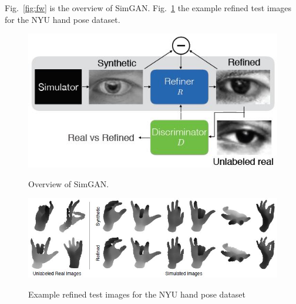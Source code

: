 \documentclass[]{IEEEtran}
\begin{document}
	Fig.~\ref{fig:fw} is the overview of SimGAN. Fig.~\ref{fig:rt} the example refined test images for the NYU hand pose dataset.
	


\newpage
\begin{figure}[!hbt]
		\vspace{1.7cm}
		\begin{center}
			\includegraphics[width=\columnwidth]{fw}
			\caption{Overview of SimGAN.}
			\label{fig:fw}
		    \hspace{0.5cm}
			\includegraphics[width=\columnwidth]{rs}
			\caption{Example refined test images for the NYU hand pose dataset}
			\label{fig:rt}
		\end{center}
	\end{figure}

%
%
%
%
%
%

\end{document}
